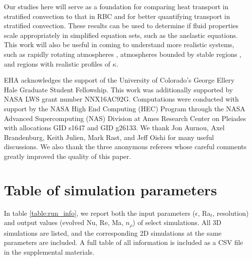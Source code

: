 \documentclass[aps, pre, onecolumn, nofootinbib, notitlepage, groupedaddress, amsfonts, amssymb, amsmath, longbibliography]{revtex4-1}
\begin{document}
Our studies here will serve as a foundation for 
comparing heat transport in stratified convection
to that in RBC \cite{johnston&doering2009}
and for better quantifying transport in stratified convection.  
These results can be used to determine if fluid properties
scale appropriately in simplified equation sets, 
such as the anelastic equations.
This work will also be useful in coming to understand more realistic systems, 
such as rapidly rotating atmospheres \cite{julien&all2012},
atmospheres bounded by stable regions \cite{hurlburt&all1986}, 
and regions with realistic profiles of $\kappa$.



\begin{acknowledgments}
EHA acknowledges the support of the University of Colorado's George 
Ellery Hale Graduate Student Fellowship.
This work was additionally supported by  NASA LWS grant number NNX16AC92G.  
Computations were conducted 
with support by the NASA High End Computing (HEC) Program through the NASA 
Advanced Supercomputing (NAS) Division at Ames Research Center on Pleiades
with allocations GID s1647 and GID g26133.
We thank Jon Aurnou, Axel Brandenburg, Keith Julien, Mark Rast, and Jeff Oishi 
for many useful discussions. We also thank the three anonymous referees whose
careful comments greatly improved the quality of this paper.
\end{acknowledgments}


\appendix
\section{Table of simulation parameters}
In table \ref{table:run_info}, we report both the input parameters ($\epsilon$, Ra$_t$, resolution)
and output values (evolved Nu, Re, Ma, $n_\rho$) of select simulations.  All 3D simulations
are listed, and the corresponding 2D simulations at the same parameters are included.  A full
table of all information is included as a CSV file in the supplemental materials.
\end{document}

